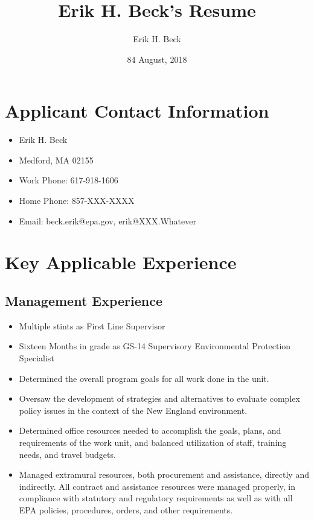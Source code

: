 \documentclass[12pt]{article}
\begin{document}
\title{Erik H. Beck's Resume}
\author{Erik H. Beck}
\date{84 August, 2018}
\maketitle

\tableofcontents

\setlength{\baselineskip}{10pt}
\section{Applicant Contact Information}

\begin{itemize}
\item
  Erik H. Beck
\item
  Medford, MA 02155
\item
  Work Phone: 617-918-1606
\item
  Home Phone: 857-XXX-XXXX
\item
  Email: beck.erik@epa.gov, erik@XXX.Whatever
\end{itemize}

\section{Key Applicable Experience}

\subsection{Management Experience}
\begin{itemize}
\item
  Multiple stints as First Line Supervisor
\item
  Sixteen Months in grade as GS-14 Supervisory Environmental Protection Specialist
\item Determined the overall program goals for all work done in the unit.
\item Oversaw the development of strategies and alternatives to evaluate complex policy issues in the context of the New England environment.
\item Determined office resources needed to accomplish the goals, plans, and requirements of the work unit, and balanced utilization of staff, training needs, and travel budgets.
\item
  Managed extramural resources, both procurement and assistance,
  directly and indirectly.  All contract and assistance resources were
  managed properly, in compliance with statutory and regulatory
  requirements as well as with all EPA policies, procedures, orders,
  and other requirements.
\end{itemize}
\end{document}
